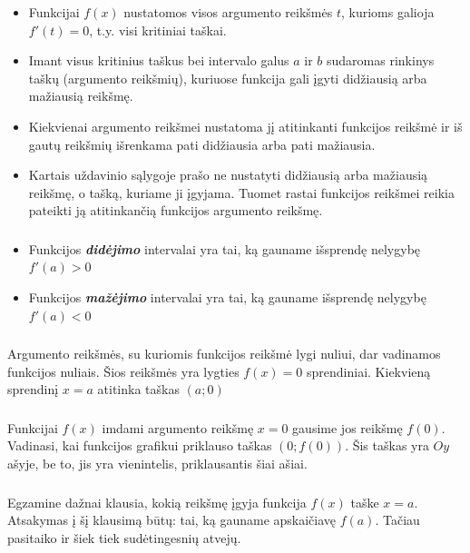 \documentclass{article}
\begin{document}
\begin{itemize}
\item Funkcijai $f(x)$ nustatomos visos argumento reikšmės $t$, kurioms galioja $f'(t)=0$, t.y. visi kritiniai taškai.
\item Imant visus kritinius taškus bei intervalo galus $a$ ir $b$ sudaromas rinkinys taškų (argumento reikšmių), kuriuose funkcija gali įgyti didžiausią arba mažiausią reikšmę.
\item Kiekvienai argumento reikšmei nustatoma jį atitinkanti funkcijos reikšmė ir iš gautų reikšmių išrenkama pati didžiausia arba pati mažiausia. 
\item Kartais uždavinio sąlygoje prašo ne nustatyti didžiausią arba mažiausią reikšmę, o tašką, kuriame ji įgyjama. Tuomet rastai funkcijos reikšmei reikia pateikti ją atitinkančią funkcijos argumento reikšmę.
\end{itemize}
\subsubsection*{}
\begin{itemize}
\item Funkcijos \textbf{\textit{didėjimo}} intervalai yra tai, ką gauname išsprendę nelygybę $f'(a)>0$
\item Funkcijos \textbf{\textit{mažėjimo}} intervalai yra tai, ką gauname išsprendę nelygybę $f'(a)<0$
\end{itemize}
\subsubsection*{}
Argumento reikšmės, su kuriomis funkcijos reikšmė lygi nuliui, dar vadinamos funkcijos nuliais. Šios reikšmės yra lygties $f(x)=0$ sprendiniai. Kiekvieną sprendinį $x=a$ atitinka taškas $(a; 0)$
\subsubsection*{}
Funkcijai $f(x)$ imdami argumento reikšmę $x=0$ gausime jos reikšmę $f(0)$. Vadinasi, kai funkcijos grafikui priklauso taškas $(0;f(0))$. Šis taškas yra $Oy$ ašyje, be to, jis yra vienintelis, priklausantis šiai ašiai.
\subsubsection*{}
Egzamine dažnai klausia, kokią reikšmę įgyja funkcija $f(x)$ taške $x=a$. Atsakymas į šį klausimą būtų: tai, ką gauname apskaičiavę $f(a)$. Tačiau pasitaiko ir šiek tiek sudėtingesnių atvejų.
\end{document}
